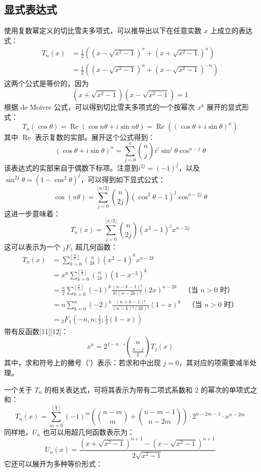 \subsection{显式表达式}
使用复数幂定义的切比雪夫多项式，可以推导出以下在任意实数 $x$ 上成立的表达式：\
$$
\begin{aligned}
T_n(x) &= \frac{1}{2} \left( \left(x - \sqrt{x^2 - 1} \right)^n + \left(x + \sqrt{x^2 - 1} \right)^n \right) \\
&= \frac{1}{2} \left( \left(x - \sqrt{x^2 - 1} \right)^n + \left(x - \sqrt{x^2 - 1} \right)^{-n} \right)
\end{aligned}~
$$
这两个公式是等价的，因为
$$
\left(x + \sqrt{x^2 - 1} \right)\left(x - \sqrt{x^2 - 1} \right) = 1~
$$
根据 de Moivre 公式，可以得到切比雪夫多项式的一个按幂次 $x^k$ 展开的显式形式：
$$
T_n(\cos \theta) = \operatorname{Re}(\cos n\theta + i\sin n\theta) = \operatorname{Re}((\cos \theta + i \sin \theta)^n)~
$$
其中 $\operatorname{Re}$ 表示复数的实部。展开这个公式得到：
$$
(\cos \theta + i \sin \theta)^n = \sum_{j=0}^{n} \binom{n}{j} i^j \sin^j \theta \cos^{n-j} \theta~
$$
该表达式的实部来自于偶数下标项。注意到$i^{2j} = (-1)^j$，以及$\sin^{2j} \theta = (1 - \cos^2 \theta)^j$，可以得到如下显式公式：
$$
\cos(n\theta) = \sum_{j = 0}^{\lfloor n/2 \rfloor} \binom{n}{2j} (\cos^2 \theta - 1)^j \cos^{n - 2j} \theta~
$$
这进一步意味着：
$$
T_n(x) = \sum_{j = 0}^{\lfloor n/2 \rfloor} \binom{n}{2j} (x^2 - 1)^j x^{n - 2j}~
$$
这可以表示为一个 ${}_2F_1$ 超几何函数：
$$
\begin{aligned}
T_n(x) &= \sum_{k=0}^{\left\lfloor \frac{n}{2} \right\rfloor}\binom{n}{2k}(x^2 - 1)^k x^{n - 2k}\\
&= x^n \sum_{k=0}^{\left\lfloor \frac{n}{2} \right\rfloor} \binom{n}{2k}(1 - x^{-2})^k\\
&= \frac{n}{2} \sum_{k=0}^{\left\lfloor \frac{n}{2} \right\rfloor} (-1)^k \frac{(n-k-1)!}{k!(n-2k)!}(2x)^{n - 2k} \quad \text{（当 } n > 0 \text{ 时）}\\
&= n \sum_{k=0}^{n} (-2)^k \frac{(n+k-1)!}{(n-k)!(2k)!} (1 - x)^k \quad \text{（当 } n > 0 \text{ 时）}\\
&= {}_2F_1 \left( -n, n; \frac{1}{2}; \frac{1}{2}(1 - x) \right)
\end{aligned}~
$$
带有反函数[11][12]：
$$
x^n = 2^{1 - n} \mathop{\sum_{\substack{j = 0 \\ j \equiv n \bmod 2}}^{n}}' \binom{n}{\tfrac{n - j}{2}} T_j(x)~
$$
其中，求和符号上的撇号（′）表示：若求和中出现 $j = 0$，其对应的项需要减半处理。

一个关于 $T_n$ 的相关表达式，可将其表示为带有二项式系数和 2 的幂次的单项式之和：
$$
T_n(x) = \sum_{m = 0}^{\left\lfloor \frac{n}{2} \right\rfloor} (-1)^m \left( \binom{n - m}{m} + \binom{n - m - 1}{n - 2m} \right) \cdot 2^{n - 2m - 1} \cdot x^{n - 2m}~
$$
同样地，$U_n$ 也可以用超几何函数表示为：
$$
U_n(x) = \frac{(x + \sqrt{x^2 - 1})^{n+1} - (x - \sqrt{x^2 - 1})^{n+1}}{2\sqrt{x^2 - 1}}~
$$
它还可以展开为多种等价形式：

